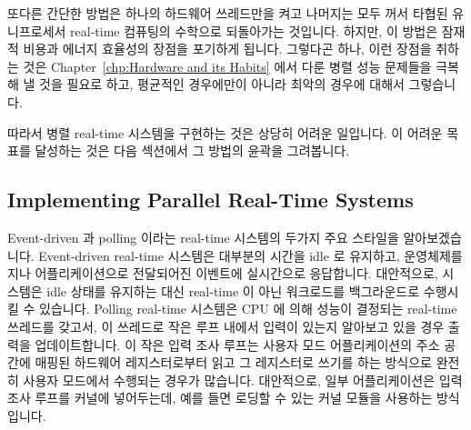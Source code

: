 또다른 간단한 방법은 하나의 하드웨어 쓰레드만을 켜고 나머지는 모두 꺼서 타협된
유니프로세서 real-time 컴퓨팅의 수학으로 되돌아가는 것입니다.
하지만, 이 방법은 잠재적 비용과 에너지 효율성의 장점을 포기하게 됩니다.
그렇다곤 하나, 이런 장점을 취하는 것은
Chapter~\ref{chp:Hardware and its Habits} 에서 다룬 병렬 성능 문제들을 극복해
낼 것을 필요로 하고, 평균적인 경우에만이 아니라 최악의 경우에 대해서
그렇습니다.

따라서 병렬 real-time 시스템을 구현하는 것은 상당히 어려운 일입니다.
이 어려운 목표를 달성하는 것은 다음 섹션에서 그 방법의 윤곽을 그려봅니다.

\subsection{Implementing Parallel Real-Time Systems}
\label{sec:advsync:Implementing Parallel Real-Time Systems}

Event-driven 과 polling 이라는 real-time 시스템의 두가지 주요 스타일을
알아보겠습니다.
Event-driven real-time 시스템은 대부분의 시간을 idle 로 유지하고, 운영체제를
지나 어플리케이션으로 전달되어진 이벤트에 실시간으로 응답합니다.
대안적으로, 시스템은 idle 상태를 유지하는 대신 real-time 이 아닌 워크로드를
백그라운드로 수행시킬 수 있습니다.
Polling real-time 시스템은 CPU 에 의해 성능이 결정되는 real-time 쓰레드를
갖고서, 이 쓰레드로 작은 루프 내에서 입력이 있는지 알아보고 있을 경우 출력을
업데이트합니다.
이 작은 입력 조사 루프는 사용자 모드 어플리케이션의 주소 공간에 매핑된 하드웨어
레지스터로부터 읽고 그 레지스터로 쓰기를 하는 방식으로 완전히 사용자 모드에서
수행되는 경우가 많습니다.
대안적으로, 일부 어플리케이션은 입력 조사 루프를 커널에 넣어두는데, 예를 들면
로딩할 수 있는 커널 모듈을 사용하는 방식입니다.

